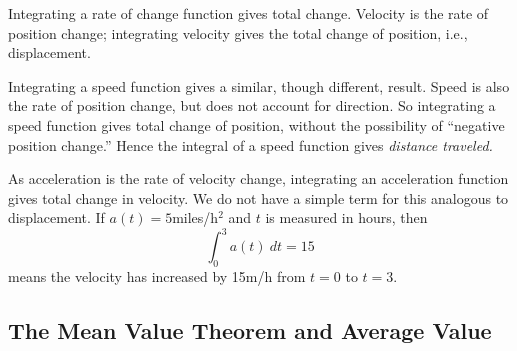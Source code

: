 Integrating a rate of change function gives total change. Velocity is the rate of position change; integrating velocity gives the total change of position, i.e., displacement.

Integrating a speed function gives a similar, though different, result. Speed is also the rate of position change, but does not account for direction. So integrating a speed function gives total change of position, without the possibility of ``negative position change.'' Hence the integral of a speed function gives \emph{distance traveled.}


As acceleration is the rate of velocity change, integrating an acceleration function gives total change in velocity. We do not have a simple term for this analogous to displacement. If $a(t) = 5$miles/h$^2$ and $t$ is measured in hours, then 
\[\int_0^3 a(t)\ dt = 15\]
means the velocity has increased by 15m/h from $t=0$ to $t=3$.

\subsection{The Mean Value Theorem and Average Value}

